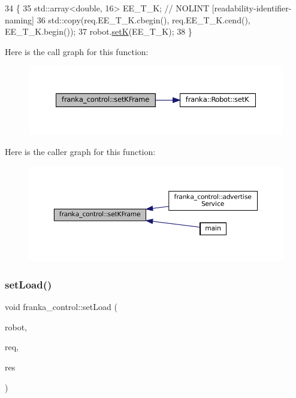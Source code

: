\begin{DoxyCode}
34                                      \{
35   std::array<double, 16> EE\_T\_K;  \textcolor{comment}{// NOLINT [readability-identifier-naming]}
36   std::copy(req.EE\_T\_K.cbegin(), req.EE\_T\_K.cend(), EE\_T\_K.begin());
37   robot.\hyperlink{classfranka_1_1Robot_ad1cf59d1b11306d80cd3c7144a989c56}{setK}(EE\_T\_K);
38 \}
\end{DoxyCode}
Here is the call graph for this function\+:
\nopagebreak
\begin{figure}[H]
\begin{center}
\leavevmode
\includegraphics[width=350pt]{namespacefranka__control_a733bf6cd47763b70eaf44b7b5a237af9_cgraph}
\end{center}
\end{figure}
Here is the caller graph for this function\+:
\nopagebreak
\begin{figure}[H]
\begin{center}
\leavevmode
\includegraphics[width=350pt]{namespacefranka__control_a733bf6cd47763b70eaf44b7b5a237af9_icgraph}
\end{center}
\end{figure}
\mbox{\label{namespacefranka__control_a3fbd42b0a097186b01181eb159ef1785}} 
\subsubsection{\texorpdfstring{set\+Load()}{setLoad()}}
{\footnotesize\ttfamily void franka\+\_\+control\+::set\+Load (\begin{DoxyParamCaption}\item[{\hyperlink{classfranka_1_1Robot}{franka\+::\+Robot} \&}]{robot,  }\item[{const Set\+Load\+::\+Request \&}]{req,  }\item[{Set\+Load\+::\+Response \&}]{res }\end{DoxyParamCaption})}



